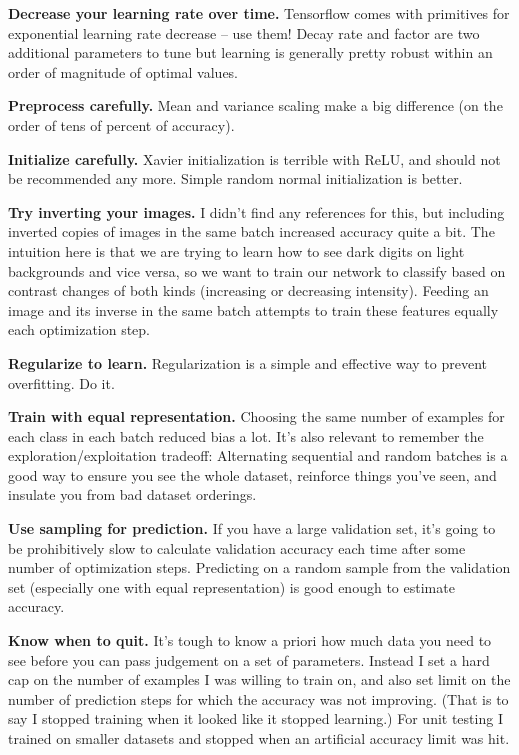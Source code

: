 \documentclass{article}
\begin{document}
\textbf{Decrease your learning rate over time.} Tensorflow comes with primitives for exponential learning rate decrease -- use them! Decay rate and factor are two additional parameters to tune but learning is generally pretty robust within an order of magnitude of optimal values.

\textbf{Preprocess carefully.} Mean and variance scaling make a big difference (on the order of tens of percent of accuracy).

\textbf{Initialize carefully.} Xavier initialization is terrible with ReLU, and should not be recommended any more. Simple random normal initialization is better.

\textbf{Try inverting your images.} I didn't find any references for this, but including inverted copies of images in the same batch increased accuracy quite a bit. The intuition here is that we are trying to learn how to see dark digits on light backgrounds and vice versa, so we want to train our network to classify based on contrast changes of both kinds (increasing or decreasing intensity). Feeding an image and its inverse in the same batch attempts to train these features equally each optimization step.

\textbf{Regularize to learn.} Regularization is a simple and effective way to prevent overfitting. Do it.

\textbf{Train with equal representation.} Choosing the same number of examples for each class in each batch reduced bias a lot.  It's also relevant to remember the exploration/exploitation tradeoff: Alternating sequential and random batches is a good way to ensure you see the whole dataset, reinforce things you've seen, and insulate you from bad dataset orderings.

\textbf{Use sampling for prediction.} If you have a large validation set, it's going to be prohibitively slow to calculate validation accuracy each time after some number of optimization steps. Predicting on a random sample from the validation set (especially one with equal representation) is good enough to estimate accuracy.

\textbf{Know when to quit.} It's tough to know a priori how much data you need to see before you can pass judgement on a set of parameters. Instead I set a hard cap on the number of examples I was willing to train on, and also set limit on the number of prediction steps for which the accuracy was not improving. (That is to say I stopped training when it looked like it stopped learning.) For unit testing I trained on smaller datasets and stopped when an artificial accuracy limit was hit.
\end{document}
